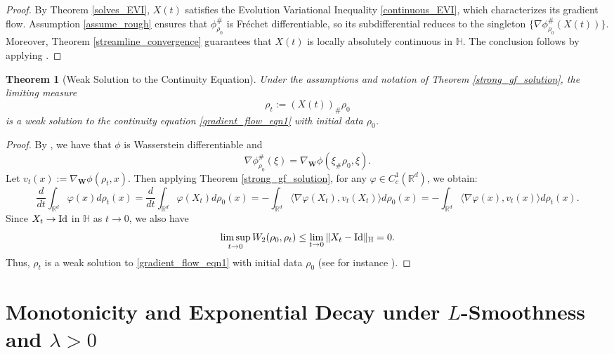 \documentclass[11pt,a4paper]{amsart}
\newcommand{\1}{\mathds{1}}
\newcommand{\R}{{\mathbb R}}
\newtheorem{theorem}{\textbf{Theorem}}[section]
\numberwithin{equation}{section}
\begin{document}
\begin{proof}  
By Theorem \ref{solves_EVI}, $X(t)$ satisfies the Evolution Variational Inequality \eqref{continuous_EVI}, which characterizes its gradient flow. Assumption \ref{assume_rough} ensures that $\phi^{\#}_{\rho_0}$ is Fréchet differentiable, so its subdifferential reduces to the singleton $\{\nabla \phi^{\#}_{\rho_0}(X(t))\}$. Moreover, Theorem \ref{streamline_convergence} guarantees that $X(t)$ is locally absolutely continuous in $\mathbb{H}$. The conclusion follows by applying \cite[Theorem 11.14]{ambrosio2021lectures}.
\end{proof}


\begin{theorem}[Weak Solution to the Continuity Equation] \label{limiting_PDE} 
Under the assumptions and notation of Theorem \ref{strong_gf_solution}, the limiting measure  
\[
\rho_t := (X(t))_{\#} \rho_0
\]
is a weak solution to the continuity equation \eqref{gradient_flow_eqn1} with initial data $\rho_0$.
\end{theorem}

\begin{proof}  
By \cite[Corollary 3.22]{gangbo2019differentiability}, we have that $\phi$ is Wasserstein differentiable and
\[
\nabla \phi^{\#}_{\rho_0}(\xi) = \nabla_{\mathbf{W}} \phi(\xi_{\#} \rho_0, \xi).
\] Let $v_t(x) := \nabla_{\mathbf{W}} \phi(\rho_t,x)$. Then applying Theorem \ref{strong_gf_solution}, for any $\varphi \in C^{1}_c(\R^d)$, we obtain:
\[
\frac{d}{dt} \int_{\R^d} \varphi(x) d\rho_t(x)  
= \frac{d}{dt} \int_{\R^d} \varphi(X_t) d\rho_0(x)  
= -\int_{\R^d} \langle \nabla \varphi(X_t), v_t(X_t) \rangle d\rho_0(x)
= -\int_{\R^d} \langle \nabla \varphi(x), v_t(x) \rangle d\rho_t(x).
\]
Since \(X_t \to \textnormal{Id}\) in \(\mathbb{H}\) as \(t \to 0\), we also have
\[
\limsup_{t \to 0} W_2(\rho_0,\rho_t) \leq \lim_{t \to 0} \|X_t - \textnormal{Id}\|_{\mathbb{H}} = 0.
\]
Thus, $\rho_t$ is a weak solution to \eqref{gradient_flow_eqn1} with initial data $\rho_0$ (see for instance \cite[Proposition 4.2]{santambrogio2015optimal}).
\end{proof}

\section{\texorpdfstring{Monotonicity and Exponential Decay under $L$-Smoothness and $\lambda>0$}{Monotonicity and Exponential Decay under L-smoothness and lambda>0}}
\label{further_stability}
\end{document}
